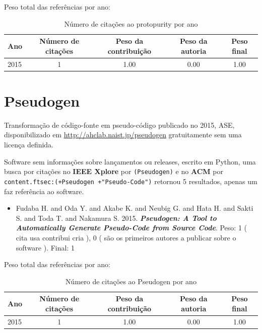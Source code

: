 Peso total das referências por ano:

\begin{table}[h]
\caption{Número de citações ao protopurity por ano}
\centering
\begin{tabular}{| l | c | c | c | c |}
  \hline
  Ano & Número de citações & Peso da contribuição & Peso da autoria & Peso final \\
  \hline
  2015
    & 1
    & 1.00
    & 0.00
    & 1.00 \\
  \hline
\end{tabular}
\end{table}


\section{Pseudogen}

Transformação de código-fonte em pseudo-código
publicado no 2015, ASE,
disponibilizado em \url{http://ahclab.naist.jp/pseudogen}
gratuitamente
sem uma licença definida.

Software sem informações sobre lançamentos ou releases,
escrito em Python,
uma busca por citações no {\bf IEEE Xplore} por
\texttt{(Pseudogen)}
e no {\bf ACM} por
\texttt{content.ftsec:(+Pseudogen +"Pseudo-Code")}
retornou
5 resultados,
apenas um faz referência ao software.

\begin{itemize}
\item Fudaba H. and Oda Y. and Akabe K. and Neubig G. and Hata H. and Sakti S. and Toda T. and Nakamura S.
      2015.
        \textbf{\textit{ Pseudogen: A Tool to Automatically Generate Pseudo-Code from Source Code}}.
      Peso:
      1 (
          cita
          usa
          contribui
          cria
      ),
      0 (
são os primeiros autores a publicar sobre o software
      ).
      Final:
      1

\end{itemize}

Peso total das referências por ano:

\begin{table}[h]
\caption{Número de citações ao Pseudogen por ano}
\centering
\begin{tabular}{| l | c | c | c | c |}
  \hline
  Ano & Número de citações & Peso da contribuição & Peso da autoria & Peso final \\
  \hline
  2015
    & 1
    & 1.00
    & 0.00
    & 1.00 \\
  \hline
\end{tabular}
\end{table}


